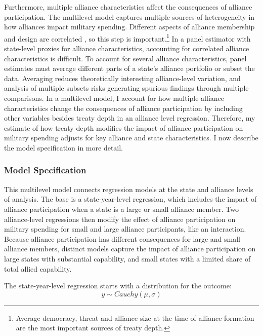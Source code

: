 \documentclass[12pt]{article}
\begin{document}
Furthermore, multiple alliance characteristics affect the consequences of alliance participation.
The multilevel model captures multiple sources of heterogeneity in how alliances impact military spending. 
Different aspects of alliance membership and design are correlated \citep{Chibaetal2015}, so this step is important.\footnote{Average democracy, threat and alliance size at the time of alliance formation are the most important sources of treaty depth.} 
In a panel estimator with state-level proxies for alliance characteristics, accounting for correlated alliance characteristics is difficult. 
To account for several alliance characteristics, panel estimates must average different parts of a state's alliance portfolio or subset the data.
Averaging reduces theoretically interesting alliance-level variation, and analysis of multiple subsets risks generating spurious findings through multiple comparisons.  
In a multilevel model, I account for how multiple alliance characteristics change the consequences of alliance participation by including other variables besides treaty depth in an alliance level regression. 
Therefore, my estimate of how treaty depth modifies the impact of alliance participation on military spending adjusts for key alliance and state characteristics. 
I now describe the model specification in more detail. 
 


\subsubsection{Model Specification} 

This multilevel model connects regression models at the state and alliance levels of analysis. 
The base is a state-year-level regression, which includes the impact of alliance participation when a state is a large or small alliance member.
Two alliance-level regressions then modify the effect of alliance participation on military spending for small and large alliance participants, like an interaction. 
Because alliance participation has different consequences for large and small alliance members, distinct models capture the impact of alliance participation on large states with substantial capability, and small states with a limited share of total allied capability. 


The state-year-level regression starts with a distribution for the outcome:
\begin{equation}
y \sim Cauchy(\mu, \sigma)
\end{equation}
 
\end{document}
